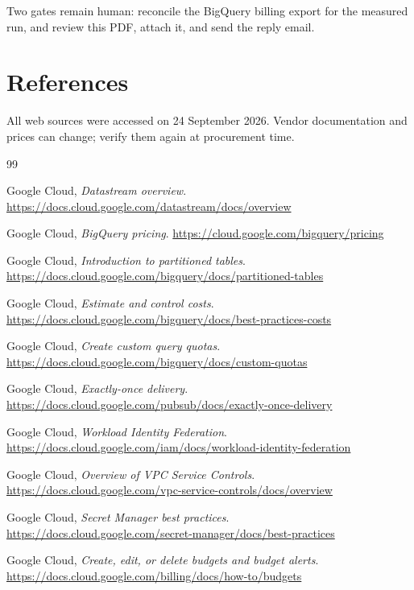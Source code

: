 \documentclass[10pt,a4paper]{article}
\begin{document}
Two gates remain human: reconcile the BigQuery billing export for the
measured run, and review this PDF, attach it, and send the reply email.

\clearpage
{}
\section*{References}
\footnotesize
\sloppy
All web sources were accessed on 24 September 2026. Vendor documentation
and prices can change; verify them again at procurement time.

\begin{thebibliography}{99}

Google Cloud, \emph{Datastream overview}.
\url{https://docs.cloud.google.com/datastream/docs/overview}

Google Cloud, \emph{BigQuery pricing}.
\url{https://cloud.google.com/bigquery/pricing}

Google Cloud, \emph{Introduction to partitioned tables}.
\url{https://docs.cloud.google.com/bigquery/docs/partitioned-tables}

Google Cloud, \emph{Estimate and control costs}.
\url{https://docs.cloud.google.com/bigquery/docs/best-practices-costs}

Google Cloud, \emph{Create custom query quotas}.
\url{https://docs.cloud.google.com/bigquery/docs/custom-quotas}

Google Cloud, \emph{Exactly-once delivery}.
\url{https://docs.cloud.google.com/pubsub/docs/exactly-once-delivery}

Google Cloud, \emph{Workload Identity Federation}.
\url{https://docs.cloud.google.com/iam/docs/workload-identity-federation}

Google Cloud, \emph{Overview of VPC Service Controls}.
\url{https://docs.cloud.google.com/vpc-service-controls/docs/overview}

Google Cloud, \emph{Secret Manager best practices}.
\url{https://docs.cloud.google.com/secret-manager/docs/best-practices}

Google Cloud, \emph{Create, edit, or delete budgets and budget alerts}.
\url{https://docs.cloud.google.com/billing/docs/how-to/budgets}


\end{thebibliography}
\end{document}
